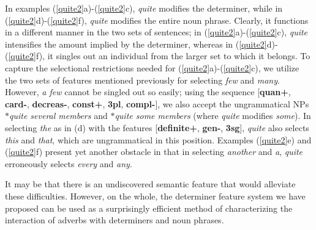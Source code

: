  
In examples (\ref{quite2}a)-(\ref{quite2}c), {\it quite} modifies the determiner, while in (\ref{quite2}d)-(\ref{quite2}f), 
{\it quite} modifies the entire noun phrase.  Clearly, it functions in a 
different manner in the two sets of sentences; in (\ref{quite2}a)-(\ref{quite2}c), {\it quite} 
intensifies the amount implied by the determiner, whereas in (\ref{quite2}d)-(\ref{quite2}f), it 
singles out an individual from the larger set to which it belongs.  To capture 
the selectional restrictions needed for (\ref{quite2}a)-(\ref{quite2}c), we utilize the two sets of 
features mentioned previously for selecting {\it few} and {\it many}.  However, 
{\it a few} cannot be singled out so easily; using the sequence [{\bf quan+}, 
{\bf card-}, {\bf decreas-}, {\bf const+}, {\bf 3pl}, {\bf compl-}], we also 
accept the ungrammatical NPs {\it $\ast$quite several members} and {\it $\ast$quite some members} (where {\it quite} modifies {\it some}).  In 
selecting {\it the} as in (d) with the features [{\bf definite+}, {\bf gen-}, {\bf 3sg}], {\it quite} also selects {\it this} and {\it that}, which are 
ungrammatical in this position.  Examples (\ref{quite2}e) and (\ref{quite2}f) present yet another 
obstacle in that in selecting {\it another} and {\it a}, {\it quite} 
erroneously selects {\it every} and {\it any}. 
 
It may be that there is an undiscovered semantic feature that would 
alleviate these difficulties.  However, on the whole, the determiner feature system we have proposed can be 
used as a surprisingly efficient method of characterizing the interaction of 
adverbs with determiners and noun phrases. 
 
 
 
 
 
 
 
 
 
